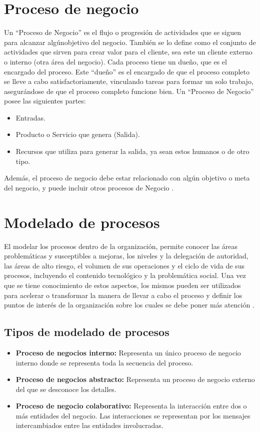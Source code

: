 \section{Proceso de negocio}
Un ``Proceso de Negocio'' es el flujo o progresión de actividades que se siguen para alcanzar algúnobjetivo del negocio. También se lo define como el conjunto de actividades que sirven para crear valor para el cliente, sea este un cliente externo o interno (otra área del negocio).
Cada proceso tiene un dueño, que es el encargado del proceso. Este “dueño” es el encargado de que el proceso completo se lleve a cabo satisfactoriamente, vinculando tareas para formar un solo trabajo, asegurándose de que el proceso completo funcione bien.\newline
Un ``Proceso de Negocio'' posee las siguientes partes:
\begin{itemize}
	\item Entradas.
		\item Producto o Servicio que genera (Salida).
			\item Recursos que utiliza para generar la salida, ya sean estos humanos o de otro tipo.
\end{itemize}
Además, el proceso de negocio debe estar relacionado con algún objetivo o meta del negocio, y puede incluir otros procesos de Negocio \citep{brunnellomodelado}.
\section{Modelado de procesos}
El modelar los procesos dentro de la organización, permite conocer las áreas problemáticas y susceptibles a mejoras, los niveles y la delegación de
autoridad, las áreas de alto riesgo, el volumen de sus operaciones y el ciclo de vida de sus procesos, incluyendo el contenido tecnológico y la
problemática social.  Una vez que se tiene conocimiento de estos aspectos, los mismos pueden ser utilizados para acelerar o transformar la manera de llevar a cabo el proceso y definir los puntos de interés de la organización sobre los cuales se debe poner más atención \citep{hitpass2017bpm}.
\subsection{Tipos de modelado de procesos}
\begin{itemize}
	\item \textbf{Proceso de negocios interno:} Representa un único proceso de negocio interno donde se representa toda la secuencia del proceso.
	\item \textbf{Proceso de negocios abstracto:} Representa un proceso de negocio externo del que se desconoce los detalles.
	\item \textbf{Proceso de negocio colaborativo:} Representa la interacción entre dos o más entidades del negocio. Las interacciones se representan por los mensajes intercambiados entre las entidades involucradas.
\end{itemize}
